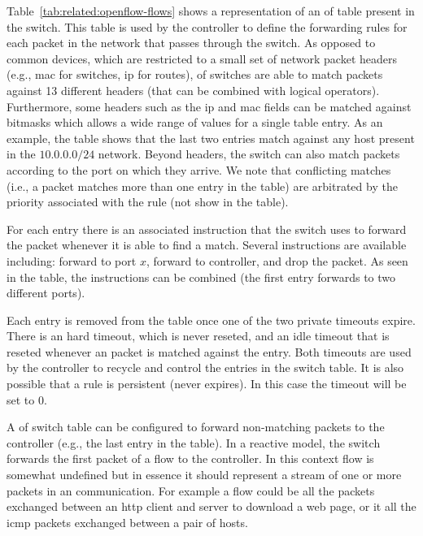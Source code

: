 Table~\ref{tab:related:openflow-flows} shows a representation of an \gls{of} table present in the switch.
This table is used by the controller to define the forwarding rules for each packet in the network that passes through the switch. 
As opposed to common devices, which are restricted to a small set of network packet headers (e.g., \gls{mac} for switches, \gls{ip} for routes), \gls{of} switches are able to match packets against 13 different headers (that can be combined with logical operators).
Furthermore, some headers such as the \gls{ip} and \gls{mac}
 fields can be matched against  bitmasks which allows  a wide range of values for a single table entry. 
As an example, the table shows that the last two entries match against any host present in the $10.0.0.0/24$ network. 
Beyond headers, the switch can also match packets according to the port on which they arrive. 
We note that conflicting matches (i.e., a packet matches more than one entry in the table) are arbitrated by the priority associated with the rule (not show in the table). 

For each entry there is an associated instruction that the switch uses to forward the packet whenever it is able to find a match. 
Several instructions are available including: forward to port $x$, forward to controller, and drop the packet. 
As seen in the table, the instructions can be combined (the first entry forwards to two different ports). 


Each entry  is removed from the table once one of the two private timeouts expire. 
There is an hard timeout, which is never reseted,  and an  idle timeout that is reseted whenever an packet is matched against the entry. 
Both timeouts are used by the controller to recycle and control the entries in the switch table.
It is also possible that a rule is persistent (never expires). 
In this case the timeout will be set to 0. 


A \gls{of} switch table can be configured to forward non-matching packets to the controller (e.g.,  the last entry in the table).
In a  reactive model, the switch forwards the first packet of a flow to the controller. 
In this context flow is somewhat undefined but in essence it should represent a stream of one or more packets in an communication.
For example a flow could be all the packets exchanged between an \gls{http} client and server to download a web page, or it  all the \gls{icmp} packets exchanged between a pair of hosts. 


